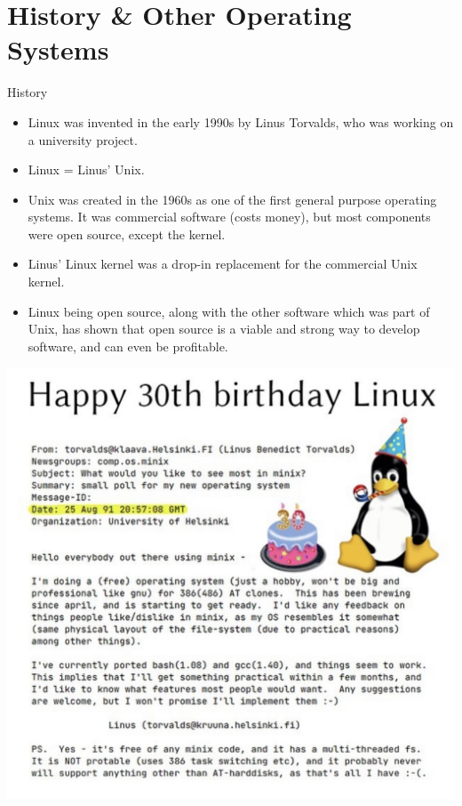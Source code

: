 \documentclass[graphics]{beamer}
\begin{document}
\section{History \& Other Operating Systems}
\begin{frame}{History}
     {
        \begin{itemize}
            \item Linux was invented in the early 1990s by Linus Torvalds, who was working on a university project.
            \item Linux = Linus' Unix.
            \item Unix was created in the 1960s as one of the first general purpose operating systems. It was commercial software (costs money), but most components were open source, except the kernel.
            \item Linus' Linux kernel was a drop-in replacement for the commercial Unix kernel.
            \item Linux being open source, along with the other software which was part of Unix, has shown that open source is a viable and strong way to develop software, and can even be profitable.
        \end{itemize}
    }
     {
        \includegraphics[scale=0.231]{Images/linux_birthday.jpg}
    }
\end{frame}
\end{document}
